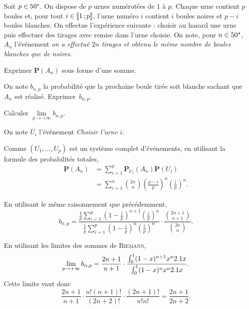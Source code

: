 \begin{exercice}
Soit $p \in 50^\star$. On dispose de $p$ urnes numérotées de $1$ à $p$. Chaque urne contient $p$ boules et, pour tout $i \in \llbracket 1\,; p \rrbracket$, l'urne numéro $i$ contient $i$ boules noires et $p - i$ boules blanches. On effectue l'expérience suivante : choisir au hasard une urne puis effectuer des tirages avec remise dans l'urne choisie. On note, pour $n \in 50^\star$, $A_n$ l'événement \textit{on a effectué $2 n$ tirages et obtenu le même nombre de boules blanches que de noires}.

\begin{questions}
\item Exprimer $\mathbf{P}(A_n)$ sous forme d'une somme.

\item On note $b_{n,p}$ la probabilité que la prochaine boule tirée soit blanche sachant que $A_n$ est réalisé. Exprimer~$b_{n,p}$.
\item Calculer $\lim\limits_{p\to+\infty} b_{n,p}$.
\end{questions}
\end{exercice}

\begin{solution}
On note $U_i$ l'événement \textit{Choisir l'urne $i$}.
\begin{reponses}
\item Comme $(U_1,\ldots,U_p)$ est un système complet d'événements, en utilisant la formule des probabilités totales,
\begin{align*}
\mathbf{P}(A_n) &= \sum_{i=1}^p \mathbf{P}_{U_i}(A_n) \mathbf{P}(U_i) \\
&= \sum_{i=1}^n \binom{2n}{n} \left(\frac{p-i}{p}\right)^n \left(\frac{i}{p}\right)^n.
\end{align*}

\item En utilisant le même raisonnement que précédemment,
\[
b_{n,p}
= \frac{\frac{1}{p} \sum\limits_{i=1}^p \left(1 - \frac{i}{p}\right)^{n+1} \left(\frac{i}{p}\right)^n}{\frac{1}{p} \sum\limits_{i=1}^p \left(1 - \frac{i}{p}\right)^{n} \left(\frac{i}{p}\right)^n} \cdot \frac{\binom{2n+1}{n+1}}{\binom{2n}{n}}.
\]

\item En utilisant les limites des sommes de \textsc{Riemann},
\[
\lim\limits_{p\to+\infty} b_{n,p} = \frac{2n+1}{n+1} \cdot \frac{\int_0^1 (1 - x)^{n+1} x^n 2.1 x}{\int_0^1 (1 - x)^n x^n 2.1 x}.
\]
Cette limite vaut donc
\[
\frac{2n+1}{n+1} \cdot \frac{n! (n+1)!}{(2n+2)!} \cdot \frac{(2n+1)!}{n! n!}  = \frac{2n+1}{2n+2}.
\]
\end{reponses}
\end{solution}

